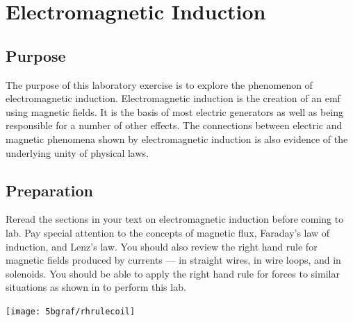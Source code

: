 \chapter{Electromagnetic Induction}

\begin{multicols}{2}
\section{Purpose}
The purpose of this laboratory exercise is to explore the phenomenon of electromagnetic induction.  Electromagnetic induction is the creation of an emf using magnetic fields.  It is the basis of most electric generators as well as being responsible for a number of other effects.  The connections between electric and magnetic phenomena shown by electromagnetic induction is also evidence of the underlying unity of physical laws.

\section{Preparation}
Reread the sections in your text on electromagnetic induction before coming to lab. Pay special attention to the concepts of magnetic flux, Faraday's law of induction, and Lenz's law.  You should also review the \textsf{right hand rule for magnetic fields} produced by currents --- in straight wires, in wire loops, and in solenoids.  You should be able to apply the \textsf{right hand rule for forces} to similar situations as shown in  to perform this lab.


\begin{center}
	\texttt{[image: 5bgraf/rhrulecoil]}
	\label{f:rhrulecoil}
\end{center}


\end{multicols}
